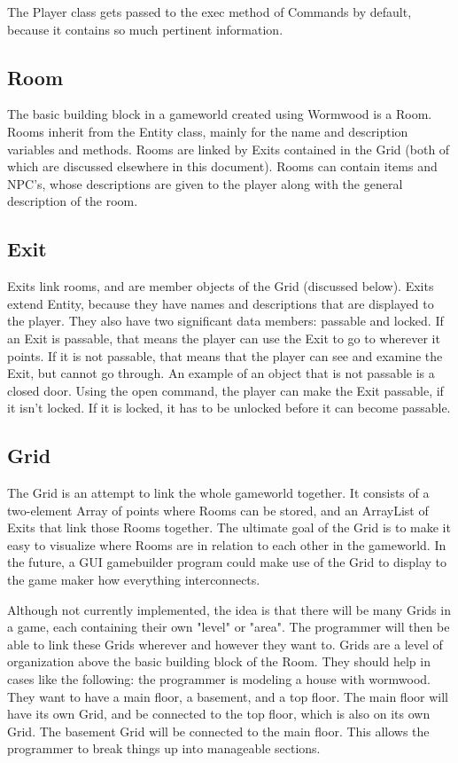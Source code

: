 \documentclass[12pt]{report}
\begin{document}
The Player class gets passed to the exec method of Commands by default,
because it contains so much pertinent information. 

\subsection{Room}
The basic building block in a gameworld created using Wormwood is a Room. Rooms inherit from the Entity class, mainly for the name and description variables and methods. Rooms are linked by Exits contained in the Grid (both of which are discussed elsewhere in this document). Rooms can contain items and NPC's, whose descriptions are given to the player along with the general description of the room.

\subsection{Exit}
Exits link rooms, and are member objects of the Grid (discussed below). Exits 
extend Entity, because they have names and descriptions that are displayed
to the player. They also have two significant data members: passable and 
locked. If an Exit is passable, that means the player can use the Exit
to go to wherever it points. If it is not passable, that means that the
player can see and examine the Exit, but cannot go through. An example of 
an object that is not passable is a closed door. Using the open command, the
player can make the Exit passable, if it isn't locked. If it is locked,
it has to be unlocked before it can become passable.

\subsection{Grid}
The Grid is an attempt to link the whole gameworld together. It consists of a 
two-element Array of points where Rooms can be stored, and an ArrayList of 
Exits that link those Rooms together. The ultimate goal of the Grid is to make
it easy to visualize where Rooms are in relation to each other in the 
gameworld. In the future, a GUI gamebuilder program could make use of the Grid
to display to the game maker how everything interconnects. 

Although not currently implemented, the idea is that there will be many
Grids in a game, each containing their own "level" or "area". The programmer
will then be able to link these Grids wherever and however they want to.
Grids are a level of organization above the basic building block of the Room.
They should help in cases like the following: the programmer is modeling a
house with wormwood. They want to have a main floor, a basement, and a top
floor. The main floor will have its own Grid, and be connected to the top 
floor, which is also on its own Grid. The basement Grid will be connected
to the main floor. This allows the programmer to break things up into
manageable sections.
\end{document}
